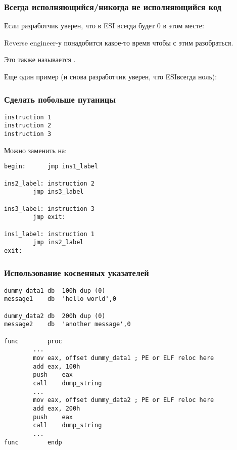 \subsubsection{Всегда исполняющийся/никогда не исполняющийся код}

Если разработчик уверен, что в ESI всегда будет 0 в этом месте:



Reverse engineer-у понадобится какое-то время чтобы с этим разобраться.

Это также называется .

Еще один пример (и снова разработчик уверен, что ESI\EMDASH{}всегда ноль):



\subsubsection{Сделать побольше путаницы}

\begin{lstlisting}
instruction 1
instruction 2
instruction 3
\end{lstlisting}

Можно заменить на:

\begin{lstlisting}
begin:		jmp	ins1_label

ins2_label:	instruction 2
		jmp	ins3_label

ins3_label:	instruction 3
		jmp	exit:

ins1_label:	instruction 1
		jmp	ins2_label
exit:
\end{lstlisting}

\subsubsection{Использование косвенных указателей}

\begin{lstlisting}
dummy_data1	db	100h dup (0)
message1	db	'hello world',0

dummy_data2	db	200h dup (0)
message2	db	'another message',0

func		proc
		...
		mov	eax, offset dummy_data1 ; PE or ELF reloc here
		add	eax, 100h
		push	eax
		call	dump_string
		...
		mov	eax, offset dummy_data2 ; PE or ELF reloc here
		add	eax, 200h
		push	eax
		call	dump_string
		...
func		endp
\end{lstlisting}

